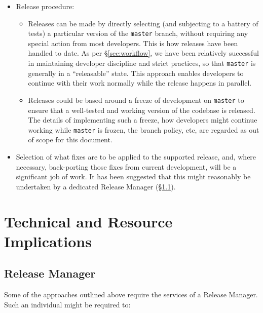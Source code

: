 \documentclass[DM,toc]{lsstdoc}
\begin{document}
\begin{itemize}

  \item{Release procedure:

    \begin{itemize}

      \item{Releases can be made by directly selecting (and subjecting to a
      battery of tests) a particular version of the \texttt{master} branch,
      without requiring any special action from most developers. This is how
      releases have been handled to date. As per \S\ref{sec:workflow}, we have
      been relatively successful in maintaining developer discipline and
      strict practices, so that \texttt{master} is generally in a
      ``releasable'' state. This approach enables developers to continue with
      their work normally while the release happens in parallel.}

      \item{Releases could be based around a freeze of development on
      \texttt{master} to ensure that a well-tested and working version of the
      codebase is released. The details of implementing such a freeze, how
      developers might continue working while \texttt{master} is frozen, the
      branch policy, etc, are regarded as out of scope for this document.}

    \end{itemize}

  }

  \item{Selection of what fixes are to be applied to the supported release,
  and, where necessary, back-porting those fixes from current development,
  will be a significant job of work. It has been suggested that this might
  reasonably be undertaken by a dedicated Release Manager
  (\S\ref{sec:releasemanager}).}

\end{itemize}

\section{Technical and Resource Implications}
\label{sec:resource}

\subsection{Release Manager}
\label{sec:releasemanager}

Some of the approaches outlined above require the services of a Release
Manager. Such an individual might be required to:
\end{document}
